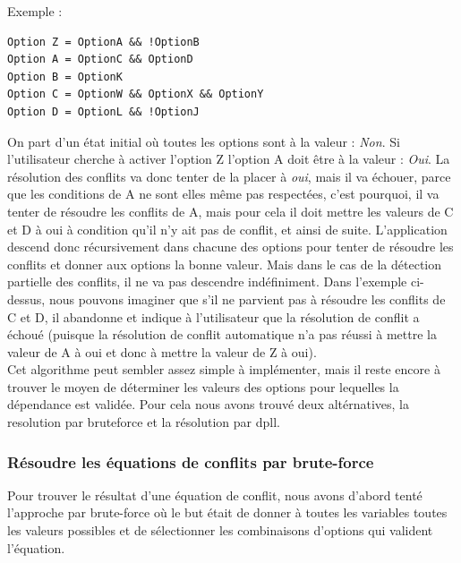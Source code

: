 \documentclass[16pts]{report}
\begin{document}
Exemple :
\begin{verbatim}
Option Z = OptionA && !OptionB
Option A = OptionC && OptionD
Option B = OptionK
Option C = OptionW && OptionX && OptionY
Option D = OptionL && !OptionJ
\end{verbatim}

On part d'un état initial où toutes les options sont à la valeur :
\textit{Non}.  Si l'utilisateur cherche à activer l'option Z l'option A doit
être à la valeur : \textit{Oui}. La résolution des conflits va donc tenter de
la placer à \textit{oui}, mais il va échouer, parce que les conditions de A ne
sont elles même pas respectées, c'est pourquoi, il va tenter de résoudre les
conflits de A, mais pour cela il doit mettre les valeurs de C et D à oui à
condition qu'il n'y ait pas de conflit, et ainsi de suite.  L'application
descend donc récursivement dans chacune des options pour tenter de résoudre les
conflits et donner aux options la bonne valeur. Mais dans le cas de la
détection partielle des conflits, il ne va pas descendre indéfiniment. Dans
l'exemple ci-dessus, nous pouvons imaginer que s'il ne parvient pas à résoudre
les conflits de C et D, il abandonne et indique à l'utilisateur que la
résolution de conflit a échoué (puisque la résolution de conflit automatique
n'a pas réussi à mettre la valeur de A à oui et donc à mettre la valeur de Z à
oui).  \\

Cet algorithme peut sembler assez simple à implémenter, mais il reste encore à
trouver le moyen de déterminer les valeurs des options pour lequelles la
dépendance est validée. Pour cela nous avons trouvé deux altérnatives, la
resolution par bruteforce et la résolution par dpll.


            \subsubsection{Résoudre les équations de conflits par brute-force}
            \label{sub:Résoudre les équations de conflits par brute-force}


Pour trouver le résultat d'une équation de conflit, nous avons d'abord tenté
l'approche par brute-force où le but était de donner à toutes les variables
toutes les valeurs possibles et de sélectionner les combinaisons d'options qui
valident l'équation.  \\
\end{document}
